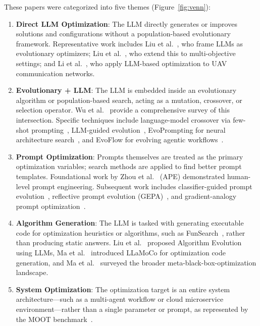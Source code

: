 \documentclass[sigconf,nonacm]{acmart}
\begin{document}
These papers were categorized into five themes (Figure~\ref{fig:venn}):
\begin{enumerate}
\item \textbf{Direct LLM Optimization}: The LLM directly generates or improves solutions and configurations without a population-based evolutionary framework. Representative work includes Liu et al.~\cite{liu2024evolutionary}, who frame LLMs as evolutionary optimizers; Liu et al.~\cite{liu2025multiobjective}, who extend this to multi-objective settings; and Li et al.~\cite{li2025uav}, who apply LLM-based optimization to UAV communication networks.
\item \textbf{Evolutionary + LLM}: The LLM is embedded inside an evolutionary algorithm or population-based search, acting as a mutation, crossover, or selection operator. Wu et al.~\cite{wu2024survey} provide a comprehensive survey of this intersection. Specific techniques include language-model crossover via few-shot prompting~\cite{meyerson2024crossover}, LLM-guided evolution~\cite{morris2024guided}, EvoPrompting for neural architecture search~\cite{chen2023evoprompting}, and EvoFlow for evolving agentic workflows~\cite{zhang2025evoflow}.
\item \textbf{Prompt Optimization}: Prompts themselves are treated as the primary optimization variables; search methods are applied to find better prompt templates. Foundational work by Zhou et al.~\cite{zhou2022ape} (APE) demonstrated human-level prompt engineering. Subsequent work includes classifier-guided prompt evolution~\cite{wong2023prompt}, reflective prompt evolution (GEPA)~\cite{agrawal2025gepa}, and gradient-analogy prompt optimization~\cite{tang2025prompt}.
\item \textbf{Algorithm Generation}: The LLM is tasked with generating executable code for optimization heuristics or algorithms, such as FunSearch~\cite{romera2023mathematical}, rather than producing static answers. Liu et al.~\cite{liu2023ael} proposed Algorithm Evolution using LLMs, Ma et al.~\cite{ma2026llamoco} introduced LLaMoCo for optimization code generation, and Ma et al.~\cite{ma2025survey} surveyed the broader meta-black-box-optimization landscape.
\item \textbf{System Optimization}: The optimization target is an entire system architecture---such as a multi-agent workflow or cloud microservice environment---rather than a single parameter or prompt, as represented by the MOOT benchmark~\cite{menzies2024moot}.
\end{enumerate}
\end{document}
